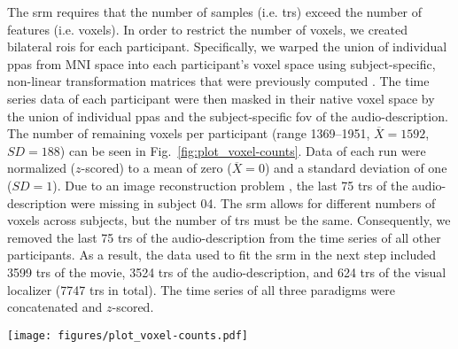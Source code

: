 
The \ac{srm} requires that the number of samples (i.e. \acp{tr}) exceed the
number of features (i.e. voxels).
%
In order to restrict the number of voxels, we created bilateral \acp{roi} for
each participant.
%
Specifically, we warped the union of individual \acp{ppa} \citep[s. Fig. 1
in][]{haeusler2022processing} from MNI space into each participant's voxel space
using subject-specific, non-linear transformation matrices that were previously
computed
\citep[][\href{https://github.com/psychoinformatics-de/studyforrest-data-templatetransforms
}{\url{github.com/psychoinformatics-de/studyforrest-data-templatetransforms}}]{hanke2014audiomovie}.
The time series data of each participant were then masked in their native voxel
space by the union of individual \acp{ppa} and the subject-specific \ac{fov} of
the audio-description.
The number of remaining voxels per participant (range 1369--1951,
$\overline{X}=1592$, $SD=188$) can be seen in Fig.~\ref{fig:plot_voxel-counts}.
Data of each run were normalized ($z$-scored) to a mean of zero
($\overline{X}=0$) and a standard deviation of one ($SD=1$).
%
Due to an image reconstruction problem \citep[cf.][]{hanke2014audiomovie}, the
last 75 \acp{tr} of the audio-description were missing in subject 04.
%
The \ac{srm} allows for different numbers of voxels across subjects, but the
number of \acp{tr} must be the same.
%
Consequently, we removed the last 75 \acp{tr} of the audio-description from the
time series of all other participants.
As a result, the data used to fit the \ac{srm} in the next step included 3599
\acp{tr} of the movie, 3524 \acp{tr} of the audio-description, and 624 \acp{tr}
of the visual localizer (7747 \acp{tr} in total).
The time series of all three paradigms were concatenated and $z$-scored.

\begin{figure*}[tbp]
\centering
\texttt{[image: figures/plot\_voxel-counts.pdf]}
\caption{
%
\textbf{Number of voxels in the bilateral regions of interest (ROIs)
of each participant.}
%
In order to reduce the number of voxels, we warped the union of
individual \acp{ppa} \citep[cf. Fig. 1 in][]{haeusler2022processing} from
MNI space into each participant's native voxel space.
%
The remaining voxels of each participant were further constrained to those
voxels that are included in the respective participant's \ac{fov} of the
audio-description \citep[cf.][]{hanke2014audiomovie}.
}
\label{fig:plot_voxel-counts}
\end{figure*}



